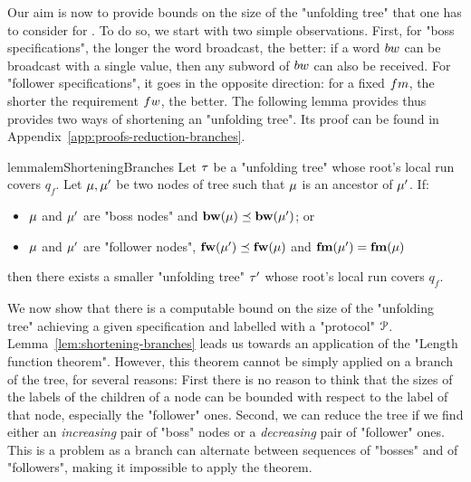 Our aim is now to provide bounds on the size of the "unfolding tree" that one has to consider for \COVER. To do so, we start with two simple observations. First, for "boss specifications", the longer the word broadcast, the better: if a word $\bossspec$ can be broadcast with a single value, then any subword of $\bossspec$ can also be received. 
For "follower specifications", it goes in the opposite direction: for a fixed $\followmessagespec$, the shorter the requirement $\followwordspec$, the better. The following lemma provides thus provides two ways of shortening an "unfolding tree". Its proof can be found in Appendix~\ref{app:proofs-reduction-branches}.

\begin{restatable}{lemma}{lemShorteningBranches} 
\label{lem:shortening-branches}
	Let $\tau$ be a "unfolding tree" whose root's local run covers $q_f$.
	Let $\mu, \mu'$ be two nodes of tree such that $\mu$ is an ancestor of $\mu'$. If:
	\begin{itemize}
	\item $\mu$ and $\mu'$ are "boss nodes" and $\mathbf{bw}(\mu) \preceq \mathbf{bw}(\mu')$; or
	\item $\mu$ and $\mu'$ are "follower nodes", $\mathbf{fw}(\mu') \preceq \mathbf{fw}(\mu)$ and $\mathbf{fm}(\mu')=\mathbf{fm}(\mu)$
	\end{itemize}
	then there exists a smaller "unfolding tree" $\tau'$ whose root's local run covers $q_f$. 
\end{restatable}


We now show that there is a computable bound on the size of the "unfolding tree" achieving a given specification and labelled with a "protocol" $\mathcal{P}$. Lemma~\ref{lem:shortening-branches} leads us towards an application of the "Length function theorem". 
However, this theorem cannot be simply applied on a branch of the tree, for several reasons: First there is no reason to think that the sizes of the labels of the children of a node can be bounded with respect to the label of that node, especially the "follower" ones.  Second, we can reduce the tree if we find either an \emph{increasing} pair of "boss" nodes or a \emph{decreasing} pair of "follower" ones. This is a problem as a branch can alternate between sequences of "bosses" and of "followers", making it impossible to apply the theorem.

